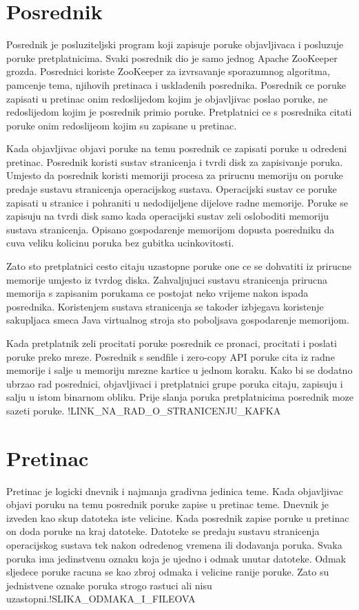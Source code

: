 \documentclass[times, utf8, diplomski, numeric]{fer}
\begin{document}
\chapter{Posrednik}
Posrednik je posluziteljski program koji zapisuje poruke objavljivaca i posluzuje poruke pretplatnicima. Svaki posrednik dio je samo jednog Apache ZooKeeper grozda. Posrednici koriste ZooKeeper za izvrsavanje sporazumnog algoritma, pamcenje tema, njihovih pretinaca i uskladenih posrednika. Posrednik ce poruke zapisati u pretinac onim redoslijedom kojim je objavljivac poslao poruke, ne redoslijedom kojim je posrednik primio poruke. Pretplatnici ce s posrednika citati poruke onim redoslijeom kojim su zapisane u pretinac.

Kada objavljivac objavi poruke na temu posrednik ce zapisati poruke u odredeni pretinac. Posrednik koristi sustav stranicenja i tvrdi disk za zapisivanje poruka. Umjesto da posrednik koristi memoriji procesa za prirucnu memoriju on poruke predaje sustavu stranicenja operacijskog sustava. Operacijski sustav ce poruke zapisati u stranice i pohraniti u nedodijeljene dijelove radne memorije. Poruke se zapisuju na tvrdi disk samo kada operacijski sustav zeli osloboditi memoriju sustava stranicenja. Opisano gospodarenje memorijom dopusta posredniku da cuva veliku kolicinu poruka bez gubitka ucinkovitosti.

Zato sto pretplatnici cesto citaju uzastopne poruke one ce se dohvatiti iz prirucne memorije umjesto iz tvrdog diska. Zahvaljujuci sustavu stranicenja prirucna memorija s zapisanim porukama ce postojat neko vrijeme nakon ispada posrednika. Koristenjem sustava stranicenja se takoder izbjegava koristenje sakupljaca smeca Java virtualnog stroja sto poboljsava gospodarenje memorijom.

Kada pretplatnik zeli procitati poruke posrednik ce pronaci, procitati i poslati poruke preko mreze. Posrednik s sendfile i zero-copy API poruke cita iz radne memorije i salje u memoriju mrezne kartice u jednom koraku. Kako bi se dodatno ubrzao rad posrednici, objavljivaci i pretplatnici grupe poruka citaju, zapisuju i salju u istom binarnom obliku. Prije slanja poruka pretplatnicima posrednik moze sazeti poruke. !LINK_NA_RAD_O_STRANICENJU_KAFKA 



\chapter{Pretinac}
Pretinac je logicki dnevnik i najmanja gradivna jedinica teme. Kada objavljivac objavi poruku na temu posrednik poruke zapise u pretinac teme. Dnevnik je izveden kao skup datoteka iste velicine. Kada posrednik zapise poruke u pretinac on doda poruke na kraj datoteke. Datoteke se predaju sustavu stranicenja operacijskog sustava tek nakon odredenog vremena ili dodavanja poruka. Svaka poruka ima jedinstvenu oznaku koja je ujedno i odmak unutar datoteke. Odmak sljedece poruke racuna se kao zbroj odmaka i velicine ranije poruke. Zato su jednistvene oznake poruka strogo rastuci ali nisu uzastopni.!SLIKA_ODMAKA_I_FILEOVA
\end{document}
